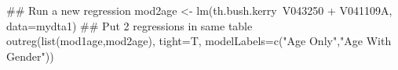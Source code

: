\begin{Schunk}
\begin{Sinput}
 ## Run a new regression
 mod2age <- lm(th.bush.kerry~V043250 + V041109A, data=mydta1)
 ## Put 2 regressions in same table
 outreg(list(mod1age,mod2age), tight=T, modelLabels=c("Age Only","Age With Gender"))
\end{Sinput}
\end{Schunk}
